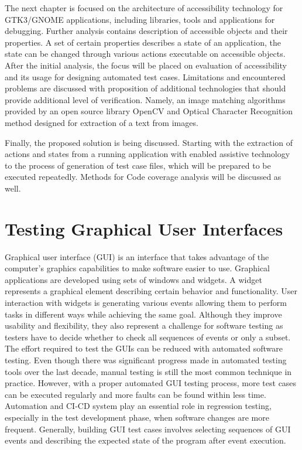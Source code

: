 The next chapter is focused on the architecture of accessibility technology for GTK3/GNOME applications, including libraries, tools and applications for debugging. Further analysis contains description of accessible objects and their properties. A set of certain properties describes a state of an application, the state can be changed through various actions executable on accessible objects. After the initial analysis, the focus will be placed on evaluation of accessibility and its usage for designing automated test cases. Limitations and encountered problems are discussed with proposition of additional technologies that should provide additional level of verification. Namely, an image matching algorithms provided by an open source library OpenCV and Optical Character Recognition method designed for extraction of a text from images.

Finally, the proposed solution is being discussed. Starting with the extraction of actions and states from a running application with enabled assistive technology to the process of generation of test case files, which will be prepared to be executed repeatedly. Methods for Code coverage analysis will be discussed as well. 

\chapter{Testing Graphical User Interfaces}
Graphical user interface (GUI) is an interface that takes advantage of the computer's graphics capabilities to make software easier to use.\cite{guidefinition} Graphical applications are developed using sets of windows and widgets. A widget represents a graphical element describing certain behavior and functionality. User interaction with widgets is generating various events allowing them to perform tasks in different ways while achieving the same goal. Although they improve usability and flexibility, they also represent a challenge for software testing as testers have to decide whether to check all sequences of events or only a subset. The effort required to test the GUIs can be reduced with automated software testing. Even though there was significant progress made in automated testing tools over the last decade, manual testing is still the most common technique in practice. However, with a proper automated GUI testing process, more test cases can be executed regularly and more faults can be found within less time.\cite{patternbasedtesting} Automation and CI-CD system play an essential role in regression testing, especially in the test development phase, when software changes are more frequent. Generally, building GUI test cases involves selecting sequences of GUI events and describing the expected state of the program after event execution.\cite{NguyenBao2014Gait}

